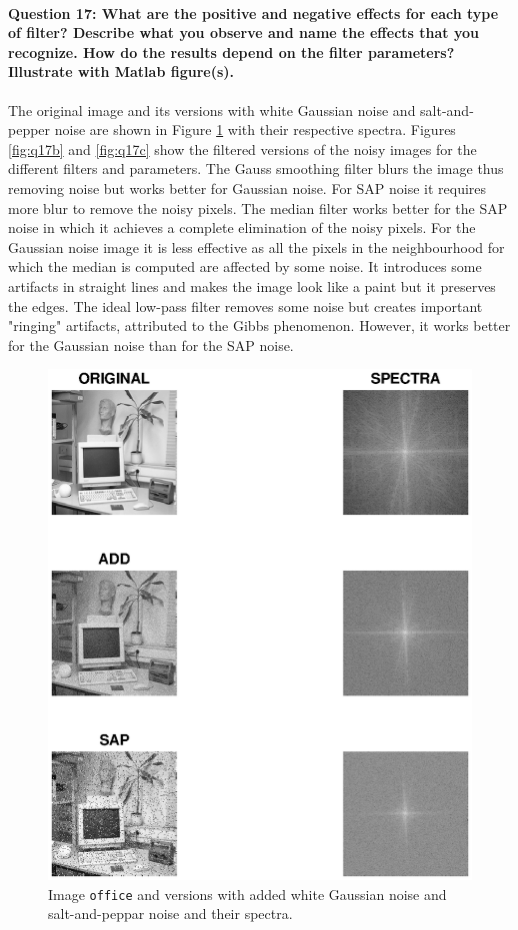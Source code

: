 \documentclass[12pt]{article}
\begin{document}
\paragraph{Question 17: What are the positive and negative effects for each type of filter? Describe what you observe and name the effects that you recognize. How do the results depend on the filter parameters? Illustrate with Matlab figure(s).}
The original image and its versions with white Gaussian noise and salt-and-pepper noise are shown in Figure \ref{fig:q17} with their respective spectra. Figures \ref{fig:q17b} and \ref{fig:q17c} show the filtered versions of the noisy images for the different filters and parameters. The Gauss smoothing filter blurs the image thus removing noise but works better for Gaussian noise. For SAP noise it requires more blur to remove the noisy pixels.
The median filter works better for the SAP noise in which it achieves a complete elimination of the noisy pixels. For the Gaussian noise image it is less effective as all the pixels in the neighbourhood for which the median is computed are affected by some noise. It introduces some artifacts in straight lines and makes the image look like a paint but it preserves the edges.
The ideal low-pass filter removes some noise but creates important "ringing" artifacts, attributed to the Gibbs phenomenon. However, it works better for the Gaussian noise than for the SAP noise.

\begin{figure}[htbp]
 \centering
 \includegraphics[width=\textwidth]{q17}
 \caption{Image \texttt{office} and versions with added white Gaussian noise and salt-and-peppar noise and their spectra.}
 \label{fig:q17}
\end{figure}
\end{document}
